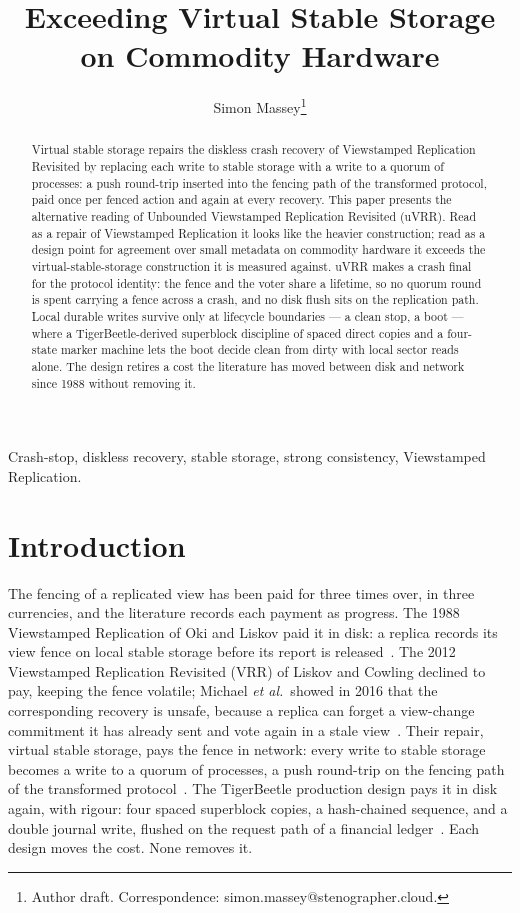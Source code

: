 \documentclass[10pt,journal,letterpaper]{IEEEtran}
\title{Exceeding Virtual Stable Storage\\on Commodity Hardware}
\author{Simon Massey\thanks{Author draft. Correspondence: simon.massey@stenographer.cloud.}}
\begin{document}
\maketitle
\thispagestyle{fancy}

\begin{abstract}
Virtual stable storage repairs the diskless crash recovery of Viewstamped
Replication Revisited by replacing each write to stable storage with a write
to a quorum of processes: a push round-trip inserted into the fencing path of
the transformed protocol, paid once per fenced action and again at every
recovery. This paper presents the alternative reading of Unbounded
Viewstamped Replication Revisited (uVRR). Read as a repair of Viewstamped
Replication it looks like the heavier construction; read as a design point
for agreement over small metadata on commodity hardware it exceeds the
virtual-stable-storage construction it is measured against. uVRR makes a
crash final for the protocol identity: the fence and the voter share a
lifetime, so no quorum round is spent carrying a fence across a crash, and no
disk flush sits on the replication path. Local durable writes survive only at
lifecycle boundaries --- a clean stop, a boot --- where a
TigerBeetle-derived superblock discipline of spaced direct copies and a
four-state marker machine lets the boot decide clean from dirty with local
sector reads alone. The design retires a cost the literature has moved
between disk and network since 1988 without removing it.
\end{abstract}

\begin{IEEEkeywords}
Crash-stop, diskless recovery, stable storage, strong consistency, Viewstamped Replication.
\end{IEEEkeywords}

\section{Introduction}\label{sec:intro}
The fencing of a replicated view has been paid for three times over, in three
currencies, and the literature records each payment as progress.
The 1988 Viewstamped Replication of Oki and Liskov paid it in disk: a replica
records its view fence on local stable storage before its report is
released~\cite{vr}.
The 2012 Viewstamped Replication Revisited (VRR) of Liskov and Cowling declined to
pay, keeping the fence volatile; Michael \emph{et al.}\ showed in 2016 that
the corresponding recovery is unsafe, because a replica can forget a
view-change commitment it has already sent and vote again in a stale
view~\cite{diskless}.
Their repair, virtual stable storage, pays the fence in network: every write
to stable storage becomes a write to a quorum of processes, a push round-trip
on the fencing path of the transformed protocol~\cite{diskless}.
The TigerBeetle production design pays it in disk again, with rigour: four
spaced superblock copies, a hash-chained sequence, and a double journal
write, flushed on the request path of a financial ledger~\cite{tigerbeetle}.
Each design moves the cost. None removes it.
\end{document}
